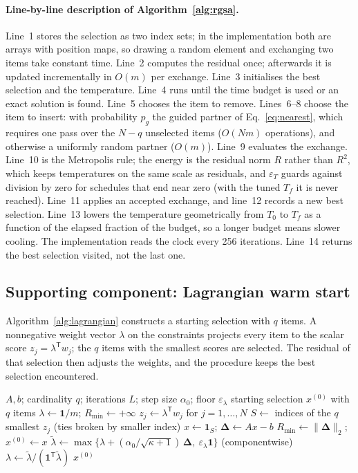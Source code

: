 \documentclass[pdflatex,sn-mathphys-num]{sn-jnl}
\theoremstyle{thmstyleone}
\theoremstyle{thmstylethree}
\newcommand{\res}{\boldsymbol{\Delta}}
\begin{document}
\paragraph{Line-by-line description of Algorithm~\ref{alg:rgsa}.}
Line~1 stores the selection as two index sets; in the implementation both are arrays with position maps, so drawing a random element and exchanging two items take constant time. Line~2 computes the residual once; afterwards it is updated incrementally in $O(m)$ per exchange. Line~3 initialises the best selection and the temperature. Line~4 runs until the time budget is used or an exact solution is found. Line~5 chooses the item to remove. Lines~6--8 choose the item to insert: with probability $p_g$ the guided partner of Eq.~\eqref{eq:nearest}, which requires one pass over the $N-q$ unselected items ($O(Nm)$ operations), and otherwise a uniformly random partner ($O(m)$). Line~9 evaluates the exchange. Line~10 is the Metropolis rule; the energy is the residual norm $R$ rather than $R^2$, which keeps temperatures on the same scale as residuals, and $\varepsilon_T$ guards against division by zero for schedules that end near zero (with the tuned $T_f$ it is never reached). Line~11 applies an accepted exchange, and line~12 records a new best selection. Line~13 lowers the temperature geometrically from $T_0$ to $T_f$ as a function of the elapsed fraction of the budget, so a longer budget means slower cooling. The implementation reads the clock every 256 iterations. Line~14 returns the best selection visited, not the last one.

\subsection{Supporting component: Lagrangian warm start}
Algorithm~\ref{alg:lagrangian} constructs a starting selection with $q$ items. A nonnegative weight vector $\lambda$ on the constraints projects every item to the scalar score $z_j=\lambda^{\mathsf T}w_j$; the $q$ items with the smallest scores are selected. The residual of that selection then adjusts the weights, and the procedure keeps the best selection encountered.

\begin{algorithm}[t]
\caption{Lagrangian warm start (supporting component)}\label{alg:lagrangian}
\begin{algorithmic}[1]
\Require $A,b$; cardinality $q$; iterations $L$; step size $\alpha_0$; floor $\varepsilon_\lambda$
\Ensure starting selection $x^{(0)}$ with $q$ items
\State $\lambda\gets\mathbf 1/m$; $R_{\min}\gets+\infty$
  \State $z_j\gets\lambda^{\mathsf T}w_j$ for $j=1,\dots,N$
  \State $S\gets$ indices of the $q$ smallest $z_j$ (ties broken by smaller index)
  \State $x\gets\mathbf 1_S$; $\res\gets Ax-b$
  \If{$\|\res\|_2<R_{\min}$} $R_{\min}\gets\|\res\|_2$; $x^{(0)}\gets x$ \EndIf
  \State $\tilde\lambda\gets\max\{\lambda+(\alpha_0/\sqrt{\kappa+1})\,\res,\ \varepsilon_\lambda\mathbf 1\}$ (componentwise)
  \State $\lambda\gets\tilde\lambda/(\mathbf 1^{\mathsf T}\tilde\lambda)$
\EndFor
\State \Return $x^{(0)}$
\end{algorithmic}
\end{algorithm}
\end{document}
